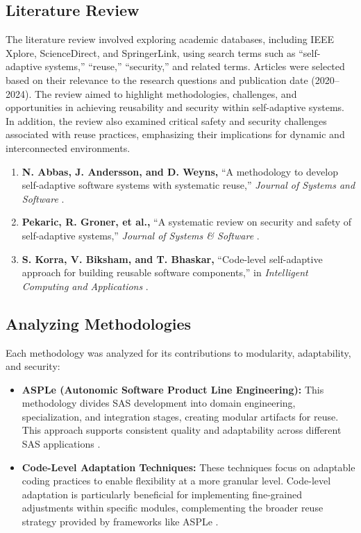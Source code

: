 \documentclass[a4paper,10pt]{article}
\begin{document}
\subsection{Literature Review}

The literature review involved exploring academic databases, including IEEE Xplore, ScienceDirect, and SpringerLink, using search terms such as “self-adaptive systems,” “reuse,” “security,” and related terms. Articles were selected based on their relevance to the research questions and publication date (2020–2024). The review aimed to highlight methodologies, challenges, and opportunities in achieving reusability and security within self-adaptive systems. In addition, the review also examined critical safety and security challenges associated with reuse practices, emphasizing their implications for dynamic and interconnected environments.

\begin{enumerate}
    \item \textbf{N. Abbas, J. Andersson, and D. Weyns,} “A methodology to develop self-adaptive software systems with systematic reuse,” \emph{Journal of Systems and Software} \cite{Nadeem2020}.
    
    \item \textbf{Pekaric, R. Groner, et al.,} “A systematic review on security and safety of self-adaptive systems,” \emph{Journal of Systems \& Software} \cite{Pekaric2023}.
    
    \item \textbf{S. Korra, V. Biksham, and T. Bhaskar,} “Code-level self-adaptive approach for building reusable software components,” in \emph{Intelligent Computing and Applications} \cite{Korra2022}.
\end{enumerate}

\subsection{Analyzing Methodologies}

Each methodology was analyzed for its contributions to modularity, adaptability, and security:

\begin{itemize}
    \item \textbf{ASPLe (Autonomic Software Product Line Engineering):} This methodology divides SAS development into domain engineering, specialization, and integration stages, creating modular artifacts for reuse. This approach supports consistent quality and adaptability across different SAS applications \cite{Nadeem2020}.
    
    \item \textbf{Code-Level Adaptation Techniques:} These techniques focus on adaptable coding practices to enable flexibility at a more granular level. Code-level adaptation is particularly beneficial for implementing fine-grained adjustments within specific modules, complementing the broader reuse strategy provided by frameworks like ASPLe \cite{Korra2022}.
\end{itemize}
\end{document}
